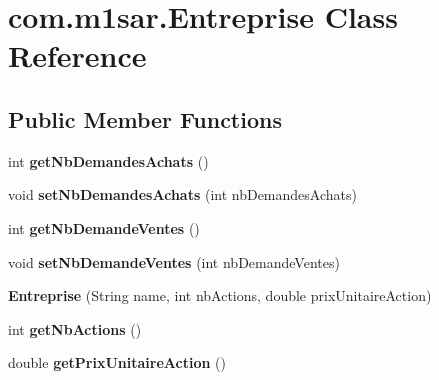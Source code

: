 \hypertarget{classcom_1_1m1sar_1_1_entreprise}{}\section{com.\+m1sar.\+Entreprise Class Reference}
\label{classcom_1_1m1sar_1_1_entreprise}
\subsection*{Public Member Functions}
\begin{DoxyCompactItemize}
\item 
\mbox{\label{classcom_1_1m1sar_1_1_entreprise_a0d94dc249f273f6d1fe6222b362934c8}} 
int {\bfseries get\+Nb\+Demandes\+Achats} ()
\item 
\mbox{\label{classcom_1_1m1sar_1_1_entreprise_a091eac6f864b9c034c7ae7b6a96bb113}} 
void {\bfseries set\+Nb\+Demandes\+Achats} (int nb\+Demandes\+Achats)
\item 
\mbox{\label{classcom_1_1m1sar_1_1_entreprise_a9378c606d234ccd1668e192fa6dc7dc9}} 
int {\bfseries get\+Nb\+Demande\+Ventes} ()
\item 
\mbox{\label{classcom_1_1m1sar_1_1_entreprise_a4c63797f5fc51ab760890e5d0137681c}} 
void {\bfseries set\+Nb\+Demande\+Ventes} (int nb\+Demande\+Ventes)
\item 
\mbox{\label{classcom_1_1m1sar_1_1_entreprise_a504a5cb6bb3e40abc4e13bd8c8957144}} 
{\bfseries Entreprise} (String name, int nb\+Actions, double prix\+Unitaire\+Action)
\item 
\mbox{\label{classcom_1_1m1sar_1_1_entreprise_a585df0a1e4be7b7b635b9d724b40d4af}} 
int {\bfseries get\+Nb\+Actions} ()
\item 
\mbox{\label{classcom_1_1m1sar_1_1_entreprise_a53c34b65f323f707adfc60abeab0366a}} 
double {\bfseries get\+Prix\+Unitaire\+Action} ()
\item 
\mbox{\label{classcom_1_1m1sar_1_1_entreprise_a83d6442a56f8aea7d43dfef97d797c76}} 

\end{DoxyCompactItemize}

